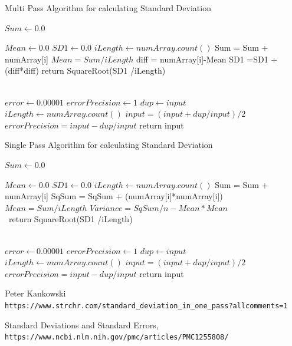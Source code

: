\documentclass[11pt]{report}
\begin{document}
\begin{algorithm}
\caption{Multi Pass Algorithm for calculating Standard Deviation}

\small
\begin{algorithmic}

\State $Sum \gets 0.0$

\State $Mean \gets 0.0$
\State $SD1 \gets 0.0$
\State $iLength \gets numArray.count()$
    \State Sum = Sum + numArray[i]
\EndFor    
\State $Mean= Sum/iLength$    
    \State diff = numArray[i]-Mean
    \State SD1 =SD1 + (diff*diff)
\EndFor
return SquareRoot(SD1 /iLength)
\EndFunction


\\
\State $error \gets 0.00001$
\State $errorPrecision \gets 1$
\State $dup \gets input$
\State $iLength \gets numArray.count()$
   \State $input = (input+dup/input)/2$
   \State $errorPrecision = input-dup/input$
\EndWhile
return input
\EndFunction
\\

\end{algorithmic}
\end{algorithm}
\pagebreak
\begin{algorithm}
\caption{Single Pass Algorithm for calculating Standard Deviation}


\begin{algorithmic}

\State $Sum \gets 0.0$

\State $Mean \gets 0.0$
\State $SD1 \gets 0.0$
\State $iLength \gets numArray.count()$
    \State Sum = Sum + numArray[i]
    \State SqSum = SqSum + (numArray[i]*numArray[i])
\EndFor    
\State $Mean= Sum/iLength$    
\State $Variance = SqSum/n - Mean*Mean$
\\
\quad\, return SquareRoot(SD1 /iLength)
\EndFunction


\\
\State $error \gets 0.00001$
\State $errorPrecision \gets 1$
\State $dup \gets input$
\State $iLength \gets numArray.count()$
   \State $input = (input+dup/input)/2$
   \State $errorPrecision = input-dup/input$
\EndWhile
return input
\EndFunction
\\

\end{algorithmic}
\end{algorithm}


\begin{thebibliography}{9}
Peter Kankowski
\\\texttt{https://www.strchr.com/standard\_deviation\_in\_one\_pass?allcomments=1}

Standard Deviations and Standard Errors,
\\\texttt{https://www.ncbi.nlm.nih.gov/pmc/articles/PMC1255808/}


\end{thebibliography}
\end{document}
